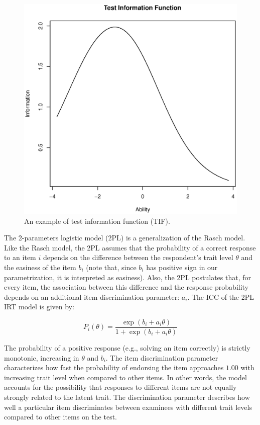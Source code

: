 \begin{figure}[h]
	\centering
	\includegraphics[scale=0.5]{tif.eps}
	\caption{An example of test information function (TIF).}
	\label{fig:tif}
\end{figure}

The 2-parameters logistic model (2PL) \parencite{birnbaum1958} is a generalization of the Rasch model.
Like the Rasch model, the 2PL assumes that the probability of a correct response to an item $i$ depends on the difference between the respondent’s trait level $\theta$ and the easiness of the item $b_i$ (note that, since $b_i$ has positive sign in our parametrization, it is interpreted as easiness).
Also, the 2PL postulates that, for every item, the association between this difference and the response probability depends on an additional item discrimination parameter: $a_i$. 
The ICC of the 2PL IRT model is given by:

\begin{equation}
P_i(\theta)=\frac{\exp(b_i+a_i\theta)}{1+ \exp(b_i+a_i\theta)}
\end{equation}

The probability of a positive response (e.g., solving an item correctly) is strictly monotonic, increasing in $\theta$ and $b_i$.
The item discrimination parameter characterizes how fast the probability of endorsing the item approaches $1.00$ with increasing trait level when compared to other items.
In other words, the model accounts for the possibility that responses to different items are not equally strongly related to the latent trait.
The discrimination parameter describes how well a particular item discriminates between examinees with different trait levels compared to other items on the test.

